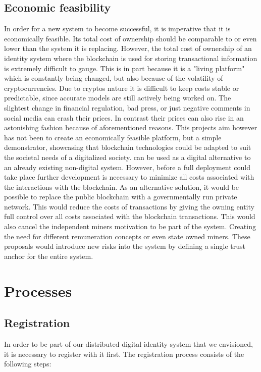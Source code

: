 \subsection{Economic feasibility}
\label{sec:economicFeasibility}
In order for a new system to become successful, it is imperative that it is economically feasible. Its total cost of ownership should be comparable to or even lower than the system it is replacing.
However, the total cost of ownership of an identity system where the blockchain is used for storing transactional information is extremely difficult to gauge. This is in part because it is a "living platform" which is constantly being changed, but also because of the volatility of cryptocurrencies.\cite{elendner2016cross}
Due to cryptos nature it is difficult to keep costs stable or predictable, since accurate models are still actively being worked on.\cite{catania2018predicting} The slightest change in financial regulation, bad press, or just negative comments in social media can crash their prices.\cite{kim2016predicting}
In contrast their prices can also rise in an astonishing fashion because of aforementioned reasons. 
This projects aim however has not been to create an economically feasible platform, but a simple demonstrator, showcasing that blockchain technologies could be adapted to suit the societal needs of a digitalized society. \projectName{} can be used as a digital alternative to an already existing non-digital system.
However, before a full deployment could take place further development is necessary to minimize all costs associated with the interactions with the blockchain.
As an alternative solution, it would be possible to replace the public blockchain with a governmentally run private network. This would reduce the costs of transactions by giving the owning entity full control over all costs associated with the blockchain transactions.
This would also cancel the independent miners motivation to be part of the system. Creating the need for different remuneration concepts or even state owned miners. These proposals would introduce new risks into the system by defining a single trust anchor for the entire system. 

\section{Processes}

\subsection{Registration}
In order to be part of our distributed digital identity system that we envisioned, it is necessary to register with it first. The registration process consists of the following steps:

